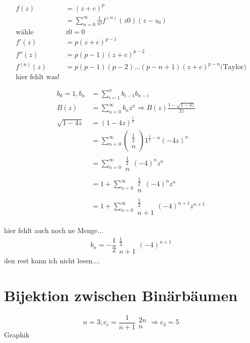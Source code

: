 \documentclass[a4paper,twoside,10pt]{report}
\begin{document}
\begin{align*}
f(z) &=(z+c)^p \\
&=\sum_{n=0}^\infty \frac{1}{n!}f^{(n)}(z0)(z-z_0)\\
\mbox{wähle }&z0=0\\
f'(z)&=p(z+c)^{p-1}\\
f''(z)&=p(p-1)(z+c)^{p-2}\\
f^{(n)}(z)&=p(p-1)(p-2)\hdots(p-n+1)(z+c)^{p-n}\mbox{(Taylor)}\\
\mbox{hier fehlt was!}
\end{align*}

\begin{align*}
b_0=1,b_n&=\sum_{i=1}^nb_{i-1}b_{n-i}\\
B(z)&=\sum_{n=0}^\infty b_nz^n\Rightarrow B(z)\frac{1-\sqrt{1-4z}}{2z}\\
\sqrt{1-4z}&=(1-4z)^\frac{1}{2}\\
&=\sum_{n=0}^\infty \left(\begin{array}{c}\frac{1}{2}\\n\end{array}\right)1^{\frac{1}{2}-n}(-4z)^n\\
&=\sum_{n=0}^\infty\begin{array}{c}\frac{1}{2}\\n\end{array}(-4)^nz^n\\
&=1+\sum_{n=0}^\infty \begin{array}{c}\frac{1}{2}\\n\end{array}(-4)^nz^n\\
&=1+\sum_{n=0}^\infty \begin{array}{c}\frac{1}{2}\\n+1\end{array}(-4)^{n+1}z^{n+1}
\end{align*}

hier fehlt auch noch ne Menge...
\[b_n=-\frac{1}{2}\begin{array}{c} \frac{1}{2} \\n+1\end{array}(-4)^{n+1}\]
den rest kann ich nicht lesen....

\section{Bijektion zwischen Binär\-bäumen}
\[n=3; c_c=\frac{1}{n+1}\begin{array}{c} 2n\\n\end{array}\Rightarrow c_3=5\]
Graphik
\end{document}
